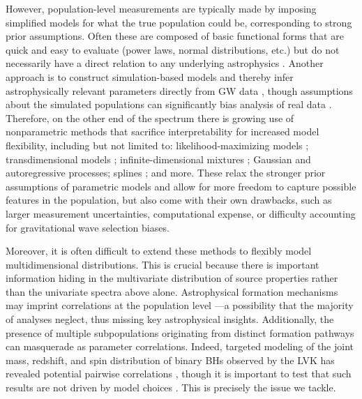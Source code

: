 \documentclass[%
reprint,
 amsmath,amssymb,
 aps,
 prd,nofootinbib,nobibnotes,
 superscriptaddress,groupedaddress,
]{revtex4-2}
\begin{document}
However, population-level measurements are typically made by imposing simplified models for what the true population could be, corresponding to strong prior assumptions. Often these are composed of basic functional forms that are quick and easy to evaluate (power laws, normal distributions, etc.) but do not necessarily have a direct relation to any underlying astrophysics \cite{KAGRA:2021duu}. Another approach is to construct simulation-based models and thereby infer astrophysically relevant parameters directly from GW data \cite{Zevin:2020gbd, Taylor:2018iat, Wong:2020ise, Mould:2022ccw, Riley:2023jep}, though assumptions about the simulated populations can significantly bias analysis of real data \cite{Cheng:2023ddt}. Therefore, on the other end of the spectrum there is growing use of nonparametric methods that sacrifice interpretability for increased model flexibility, including but not limited to: likelihood-maximizing models \cite{Payne:2022xan}; transdimensional models \cite{Toubiana:2023egi}; infinite-dimensional mixtures \cite{Rinaldi:2021bhm}; Gaussian \cite{Mandel:2016prl, KAGRA:2021duu, Ray:2023upk, Farah:2024xub} and autoregressive \cite{Callister:2023tgi} processes; splines \cite{Edelman:2022ydv, Golomb:2022bon}; and more. These relax the stronger prior assumptions of parametric models and allow for more freedom to capture possible features in the population, but also come with their own drawbacks, such as larger measurement uncertainties, computational expense, or difficulty accounting for gravitational wave selection biases.

Moreover, it is often difficult to extend these methods to flexibly model multidimensional distributions. This is crucial because there is important information hiding in the multivariate distribution of source properties rather than the univariate spectra above alone. Astrophysical formation mechanisms may imprint correlations at the population level \cite{PortegiesZwart:2002iks, Rodriguez:2015oxa, Bavera:2020uch, Bavera:2022mef, Santini:2023ukl, Baibhav:2022qxm, Gerosa:2021mno, vanSon:2021zpk, Marchant:2023ncp}---a possibility that the majority of analyses neglect, thus missing key astrophysical insights. Additionally, the presence of multiple subpopulations originating from distinct formation pathways can masquerade as parameter correlations. Indeed, targeted modeling of the joint mass, redshift, and spin distribution of binary BHs observed by the LVK has revealed potential pairwise correlations \cite{Callister:2021fpo, Biscoveanu:2022qac, Franciolini:2022iaa, Li:2023yyt, Pierra:2024fbl, Ray:2024hos, Rinaldi:2023bbd}, though it is important to test that such results are not driven by model choices \cite{Heinzel:2023hlb}. This is precisely the issue we tackle.
\end{document}
